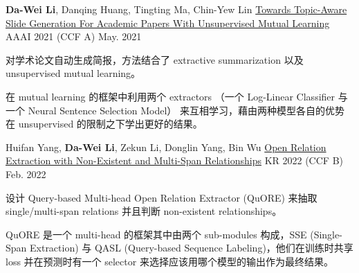 

\begin{cventries}

  \cventry
    {\textbf{Da-Wei Li}, Danqing Huang, Tingting Ma, Chin-Yew Lin} %
    {\href{https://www.microsoft.com/en-us/research/publication/towards-topic-aware-slide-generation-for-academic-papers-with-unsupervised-mutual-learning/}{Towards Topic-Aware Slide Generation For Academic Papers With Unsupervised Mutual Learning}} %
    {AAAI 2021 (CCF A)} %
    {May. 2021} %
    {
      \begin{cvitems} %
        \item {对学术论文自动生成简报，方法结合了 extractive summarization 以及 unsupervised mutual learning。}
        \item {在 mutual learning 的框架中利用两个 extractors （一个 Log-Linear Classifier 与一个 Neural Sentence Selection Model） 来互相学习，藉由两种模型各自的优势在 unsupervised 的限制之下学出更好的结果。}
      \end{cvitems}
    }

  \cventry
    {Huifan Yang, \textbf{Da-Wei Li}, Zekun Li, Donglin Yang, Bin Wu} %
    {\href{https://www.easychair.org/publications/preprint_open/jz3j}{Open Relation Extraction with Non-Existent and Multi-Span Relationships}} %
    {KR 2022 (CCF B)} %
    {Feb. 2022} %
    {
      \begin{cvitems} %
        \item {设计 Query-based Multi-head Open Relation Extractor (QuORE) 来抽取 single/multi-span relations 并且判断 non-existent relationships。}
        \item {QuORE 是一个 multi-head 的框架其中由两个 sub-modules 构成，SSE (Single-Span Extraction) 与 QASL (Query-based Sequence Labeling)，他们在训练时共享 loss 并在预测时有一个 selector 来选择应该用哪个模型的输出作为最终结果。}
      \end{cvitems}
    }


\end{cventries}

